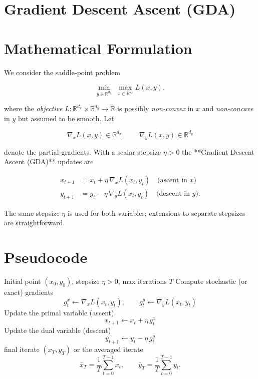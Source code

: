 \documentclass{article}
\begin{document}
\section*{Gradient Descent Ascent (GDA)}

\section*{Mathematical Formulation}
We consider the saddle‑point problem  

\[
\min_{y\in\mathbb{R}^{d_y}}\;\max_{x\in\mathbb{R}^{d_x}} L(x,y),
\]

where the \emph{objective} \(L:\mathbb{R}^{d_x}\times\mathbb{R}^{d_y}\rightarrow\mathbb{R}\) is possibly \emph{non‑convex} in \(x\) and \emph{non‑concave} in \(y\) but assumed to be smooth.  
Let  

\[
\nabla_x L(x,y)\in\mathbb{R}^{d_x},\qquad 
\nabla_y L(x,y)\in\mathbb{R}^{d_y}
\]

denote the partial gradients.  
With a scalar stepsize \(\eta>0\) the **Gradient Descent Ascent (GDA)** updates are  

\[
\boxed{
\begin{aligned}
x_{t+1}&=x_t+\eta\,\nabla_x L(x_t,y_t) \quad\text{(ascent in }x\text{)}\\
y_{t+1}&=y_t-\eta\,\nabla_y L(x_t,y_t) \quad\text{(descent in }y\text{)} .
\end{aligned}}
\tag{1}
\]

The same stepsize \(\eta\) is used for both variables; extensions to separate stepsizes are straightforward.

\section*{Pseudocode}
\begin{algorithm}[H]
\caption{Gradient Descent Ascent (GDA)}
\begin{algorithmic}[1]
\Require Initial point \((x_0,y_0)\), stepsize \(\eta>0\), max iterations $T$
    \State Compute stochastic (or exact) gradients  
    \[
    g^x_t \gets \nabla_x L(x_t,y_t),\qquad 
    g^y_t \gets \nabla_y L(x_t,y_t)
    \]
    \State Update the primal variable (ascent)
    \[
    x_{t+1}\gets x_t+\eta\, g^x_t
    \]
    \State Update the dual variable (descent)
    \[
    y_{t+1}\gets y_t-\eta\, g^y_t
    \]
\EndFor
\State \Return final iterate \((x_T,y_T)\) or the averaged iterate
\[
\bar x_T=\frac1T\sum_{t=0}^{T-1}x_t,\qquad 
\bar y_T=\frac1T\sum_{t=0}^{T-1}y_t .
\]
\end{algorithmic}
\end{algorithm}
\end{document}
